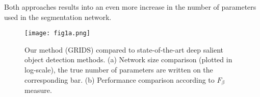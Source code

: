 \documentclass[a4paper,conference]{IEEEtran}
\begin{document}
Both approaches results into an even more increase in the number of parameters used in the segmentation network. 

\begin{figure}[!t]
\texttt{[image: fig1a.png]}


\caption{Our method (GRIDS) compared to state-of-the-art deep salient object detection methods. (a) Network size comparison (plotted in log-scale), the true number of parameters are written on the corresponding bar. (b) Performance comparison according to $F_\beta$ measure.}
\label{fig0}
\end{figure}

\end{document}
